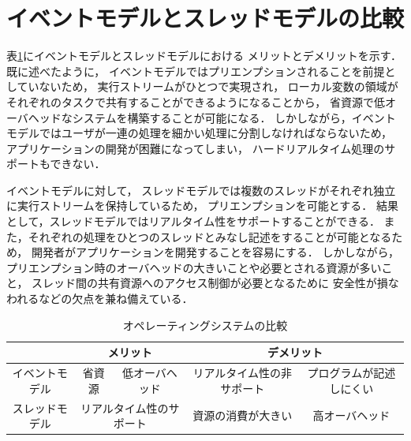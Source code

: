 \section{イベントモデルとスレッドモデルの比較}
表\ref{tab:merit_and_demerit}にイベントモデルとスレッドモデルにおける
メリットとデメリットを示す．
既に述べたように，
イベントモデルではプリエンプションされることを前提としていないため，
実行ストリームがひとつで実現され，
ローカル変数の領域がそれぞれのタスクで共有することができるようになることから，
省資源で低オーバヘッドなシステムを構築することが可能になる．
しかしながら，イベントモデルではユーザが一連の処理を細かい処理に分割しなければならないため，
アプリケーションの開発が困難になってしまい，
ハードリアルタイム処理のサポートもできない．


イベントモデルに対して，
スレッドモデルでは複数のスレッドがそれぞれ独立に実行ストリームを保持しているため，
プリエンプションを可能とする．
結果として，スレッドモデルではリアルタイム性をサポートすることができる．
また，それぞれの処理をひとつのスレッドとみなし記述をすることが可能となるため，
開発者がアプリケーションを開発することを容易にする．
しかしながら，プリエンプション時のオーバヘッドの大きいことや必要とされる資源が多いこと，
スレッド間の共有資源へのアクセス制御が必要となるために
安全性が損なわれるなどの欠点を兼ね備えている．


%



\begin{table}[htb]
  \centering
  \caption{オペレーティングシステムの比較}
  \begin{tabular}{|c||c|c|c|c|} \hline
    \backslashbox{}{} & \multicolumn{2}{|c|}{メリット} & \multicolumn{2}{|c|}{デメリット} \\ \hline \hline
    イベントモデル & 省資源 & 低オーバヘッド & リアルタイム性の非サポート & プログラムが記述しにくい \\ \hline
    スレッドモデル & \multicolumn{2}{|c|}{リアルタイム性のサポート} & 資源の消費が大きい & 高オーバヘッド \\ \hline
  \end{tabular}
  \label{tab:merit_and_demerit}
\end{table}





